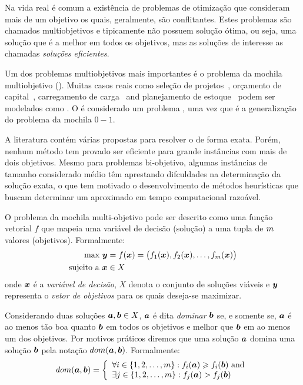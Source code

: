 Na vida real é comum a existência de problemas de otimização que
consideram mais de um objetivo os quais, geralmente, são conflitantes.
Estes problemas são chamados multiobjetivos e tipicamente não possuem
solução ótima, ou seja, uma solução que é a melhor em todos os objetivos,
mas as soluções de interesse as chamadas \emph{soluções eficientes}.

Um dos problemas multiobjetivos mais importantes é o problema da mochila
multiobjetivo (\mokp).
Muitas casos reais como seleção de projetos~\cite{teng1996multiobjective},
orçamento de capital~\cite{rosenblatt1989generating},
carregamento de carga~\cite{teng1996multiobjective}
and planejamento de estoque~\cite{ishibuchi2015behavior}
podem ser modelados como \mokp.
O \mokp é considerado um problema \nphard{}, uma vez que é a generalização
do problema da mochila $0-1$.

A literatura contém várias propostas para resolver o \mokp de forma exata.
Porém, nenhum método tem provado ser eficiente para grande instâncias
com mais de dois objetivos.
Mesmo para problemas bi-objetivo, algumas instâncias de tamanho considerado
médio têm aprestando difculdades na determinação da solução exata, o que
tem motivado o desenvolvimento de métodos heurísticas que buscam determinar
um \paretoset aproximado em tempo computacional razoável.


O problema da mochila multi-objetivo pode ser descrito como uma função vetorial
$f$ que mapeia uma variável de decisão (solução) a uma tupla de $m$ valores
(objetivos).
Formalmente:
\begin{align*}
  \text{max} ~ \boldsymbol{y} &= f(\boldsymbol{x}) =
    \big(f_1(\boldsymbol{x})
    ,f_2(\boldsymbol{x})
    ,\ldots
    ,f_{m}(\boldsymbol{x})\big) \\
  \text{sujeito a} ~ \boldsymbol{x} & \in X
\end{align*}
onde $\boldsymbol{x}$ é a \emph{variável de decisão}, $X$ denota o conjunto de
soluções viáveis e $\boldsymbol{y}$ representa o \emph{vetor de objetivos} para os quais
deseja-se maximizar.

Considerando duas soluções $\boldsymbol{a}, \boldsymbol{b} \in X$, $\boldsymbol{a}$ é dita
\emph{dominar} $\boldsymbol{b}$ se, e somente se, $\boldsymbol{a}$ é ao menos tão boa quanto
$\boldsymbol{b}$ em todos os objetivos e melhor que $\boldsymbol{b}$ em ao menos um dos objetivos.
Por motivos práticos diremos que uma solução $\boldsymbol{a}$ domina uma solução $\boldsymbol{b}$
pela notação $dom(\boldsymbol{a}, \boldsymbol{b})$.
Formalmente:
\begin{displaymath}
    dom(\boldsymbol{a}, \boldsymbol{b}) = \left\{
      \begin{array}{l}
          \forall i \in \{1, 2, \ldots, m\}: f_i(\boldsymbol{a}) \geqslant f_i(\boldsymbol{b}) ~\text{and}\\
          \exists j \in \{1, 2, \ldots, m\}: f_j(\boldsymbol{a}) > f_j(\boldsymbol{b})
  \end{array} \right.
\end{displaymath}


